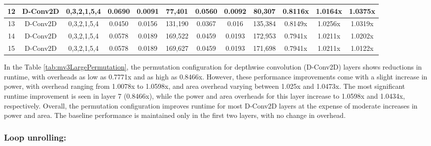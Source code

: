 \begin{table}[htbp]
{\begin{tabular}{|c|c|c|c|c|c|c|c|c|c|c|c|}
12 & D-Conv2D & 0,3,2,1,5,4 & 0.0690 & 0.0091 & 77,401 & 0.0560 & 0.0092 & 80,307 & 0.8116x & 1.0164x & 1.0375x \\ \hline
13 & D-Conv2D & 0,3,2,1,5,4 & 0.0450 & 0.0156 & 131,190 & 0.0367 & 0.016 & 135,384 & 0.8149x & 1.0256x & 1.0319x \\ \hline
14 & D-Conv2D & 0,3,2,1,5,4 & 0.0578 & 0.0189 & 169,522 & 0.0459 & 0.0193 & 172,953 & 0.7941x & 1.0211x & 1.0202x \\ \hline
15 & D-Conv2D & 0,3,2,1,5,4 & 0.0578 & 0.0189 & 169,627 & 0.0459 & 0.0193 & 171,698 & 0.7941x & 1.0211x & 1.0122x \\ \hline
\end{tabular}
}
\end{table}

In the Table \ref{tab:mv3LargePermutation}, the permutation configuration for depthwise convolution (D-Conv2D) layers shows reductions in runtime, with overheads as low as 0.7771x and as high as 0.8466x. However, these performance improvements come with a slight increase in power, with overhead ranging from 1.0078x to 1.0598x, and area overhead varying between 1.025x and 1.0473x. The most significant runtime improvement is seen in layer 7 (0.8466x), while the power and area overheads for this layer increase to 1.0598x and 1.0434x, respectively. Overall, the permutation configuration improves runtime for most D-Conv2D layers at the expense of moderate increases in power and area. The baseline performance is maintained only in the first two layers, with no change in overhead.

\clearpage
\subsubsection{Loop unrolling:}

